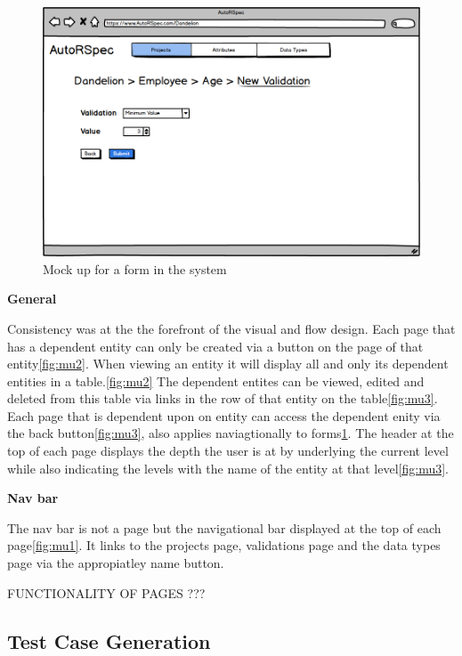 \documentclass[a4paper,12pt]{article}
\begin{document}
\begin{figure}
\includegraphics[width=\linewidth]{screenshots/muform}
\caption{Mock up for a form in the system}
\label{fig:mu4}
\end{figure}

\par \textbf{General}
\par Consistency was at the the forefront of the visual and flow design. Each page that has a dependent entity can only be created via a button on the page of that entity\ref{fig:mu2}. When viewing an entity it will display all and only its dependent entities in a table.\ref{fig:mu2} The dependent entites can be viewed, edited and deleted from this table via links in the row of that entity on the table\ref{fig:mu3}. Each page that is dependent upon on entity can access the dependent enity via the back button\ref{fig:mu3}, also applies naviagtionally to forms\ref{fig:mu4}. The header at the top of each page displays the depth the user is at by underlying the current level while also indicating the levels with the name of the entity at that level\ref{fig:mu3}.

\par \textbf{Nav bar}
\par The nav bar is not a page but the navigational bar displayed at the top of each page\ref{fig:mu1}. It links to the projects page, validations page and the data types page via the appropiatley name button.

\par FUNCTIONALITY OF PAGES ???


\subsection{Test Case Generation}
\end{document}
